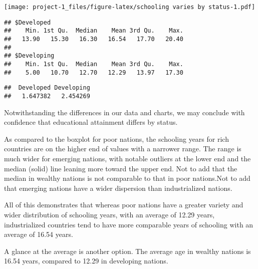 \documentclass[
]{article}
\newenvironment{Shaded}{\begin{snugshade}}{\end{snugshade}}
\newcommand{\FunctionTok}[1]{\textcolor[rgb]{0.00,0.00,0.00}{#1}}
\newcommand{\NormalTok}[1]{#1}
\newcommand{\SpecialCharTok}[1]{\textcolor[rgb]{0.00,0.00,0.00}{#1}}
\begin{document}
\texttt{[image: project-1\_files/figure-latex/schooling varies by status-1.pdf]}

\begin{Shaded}
\end{Shaded}

\begin{verbatim}
## $Developed
##    Min. 1st Qu.  Median    Mean 3rd Qu.    Max. 
##   13.90   15.30   16.30   16.54   17.70   20.40 
## 
## $Developing
##    Min. 1st Qu.  Median    Mean 3rd Qu.    Max. 
##    5.00   10.70   12.70   12.29   13.97   17.30
\end{verbatim}

\begin{Shaded}
\end{Shaded}

\begin{verbatim}
##  Developed Developing 
##   1.647382   2.454269
\end{verbatim}

Notwithstanding the differences in our data and charts, we may conclude
with confidence that educational attainment differs by status.

As compared to the boxplot for poor nations, the schooling years for
rich countries are on the higher end of values with a narrower range.
The range is much wider for emerging nations, with notable outliers at
the lower end and the median (solid) line leaning more toward the upper
end. Not to add that the median in wealthy nations is not comparable to
that in poor nations.Not to add that emerging nations have a wider
dispersion than industrialized nations.

All of this demonstrates that whereas poor nations have a greater
variety and wider distribution of schooling years, with an average of
12.29 years, industrialized countries tend to have more comparable years
of schooling with an average of 16.54 years.

A glance at the average is another option. The average age in wealthy
nations is 16.54 years, compared to 12.29 in developing nations.
\end{document}
